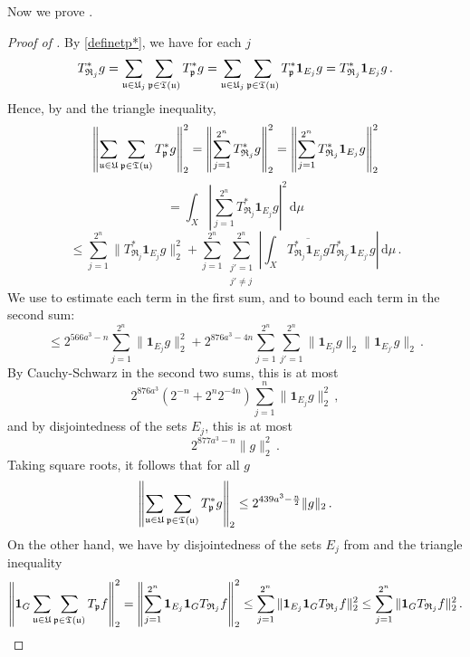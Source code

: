 Now we prove .

\begin{proof}[Proof of ]
    \leanok
    By \eqref{definetp*}, we have for each $j$
    $$
        T_{\mathfrak{R}_j}^*g = \sum_{{\mathfrak u} \in {\mathfrak U}_j} \sum_{{\mathfrak p} \in {\mathfrak T}({\mathfrak u})} T_{{\mathfrak p}}^* g = \sum_{{\mathfrak u} \in {\mathfrak U}_j} \sum_{{\mathfrak p} \in {\mathfrak T}({\mathfrak u})} T_{{\mathfrak p}}^* \mathbf{1}_{E_j} g = T_{\mathfrak{R}_j}^* \mathbf{1}_{E_j} g\,.
    $$
    Hence, by  and the triangle inequality,
    $$
        \left\|\sum_{{\mathfrak u} \in {\mathfrak U}} \sum_{{\mathfrak p} \in {\mathfrak T}({\mathfrak u})} T^*_{{\mathfrak p}} g\right\|_2^2 = \left\|\sum_{j = 1}^{2^n} T^*_{\mathfrak{R}_{j}} g\right\|_2^2 = \left\|\sum_{j=1}^{2^n} T^*_{\mathfrak{R}_{j}} \mathbf{1}_{E_j} g\right\|_2^2
    $$
    $$
        = \int_X \left|\sum_{j=1}^{2^n} T^*_{\mathfrak{R}_{j}} \mathbf{1}_{E_j} g\right|^2 \, \mathrm{d}\mu
    $$
    $$
        \le \sum_{j=1}^{2^n} \|T_{\mathfrak{R}_j}^* \mathbf{1}_{E_j} g\|_2^2 + \sum_{j =1}^{2^n} \sum_{\substack{j' = 1\\j' \ne j}}^{2^n} \left| \int_X \overline{ T_{\mathfrak{R}_j}^* \mathbf{1}_{E_j} g} T_{\mathfrak{R}_{j'}}^* \mathbf{1}_{E_{j'}} g \right| \, \mathrm{d}\mu\,.
    $$
    We use  to estimate each term in the first sum, and  to bound each term in the second sum:
    $$
        \le 2^{566a^3-n} \sum_{j = 1}^{2^n} \|\mathbf{1}_{E_j} g\|_2^2 + 2^{876a^3-4n}\sum_{j=1}^{2^n}\sum_{j' = 1}^{2^n} \|\mathbf{1}_{E_j} g\|_2 \|\mathbf{1}_{E_{j'}}g\|_2\,.
    $$
    By Cauchy-Schwarz in the second two sums, this is at most
    $$
        2^{876a^3} (2^{-n} + 2^{n}2^{-4n}) \sum_{j = 1}^n \|\mathbf{1}_{E_j} g\|_2^2\,,
    $$
    and by disjointedness of the sets $E_j$, this is at most
    $$
        2^{877a^3 - n} \|g\|_2^2\,.
    $$
    Taking square roots, it follows that for all $g$
    \begin{equation}
        \label{eq-forest-bound-1}
        \left\|\sum_{{\mathfrak u} \in {\mathfrak U}} \sum_{{\mathfrak p} \in {\mathfrak T}({\mathfrak u})} T_{{\mathfrak p}}^* g\right\|_2 \le 2^{439a^3-\frac{n}{2}} \|g\|_2\,.
    \end{equation}
    On the other hand, we have by disjointedness of the sets $E_j$ from  and the triangle inequality
    $$
        \left\|\mathbf{1}_G \sum_{{\mathfrak u} \in {\mathfrak U}} \sum_{{\mathfrak p} \in {\mathfrak T}({\mathfrak u})} T_{{\mathfrak p}} f\right\|_2^2 = \left\|\sum_{j=1}^{2^n} \mathbf{1}_{E_j} \mathbf{1}_G T_{\mathfrak{R}_{j}} f\right\|_2^2 \le \sum_{j = 1}^{2^n} \|\mathbf{1}_{E_j} \mathbf{1}_G T_{\mathfrak{R}_{j}} f\|_2^2 \le \sum_{j = 1}^{2^n} \|\mathbf{1}_G T_{\mathfrak{R}_{j}} f\|_2^2\,.
$$
\end{proof}
